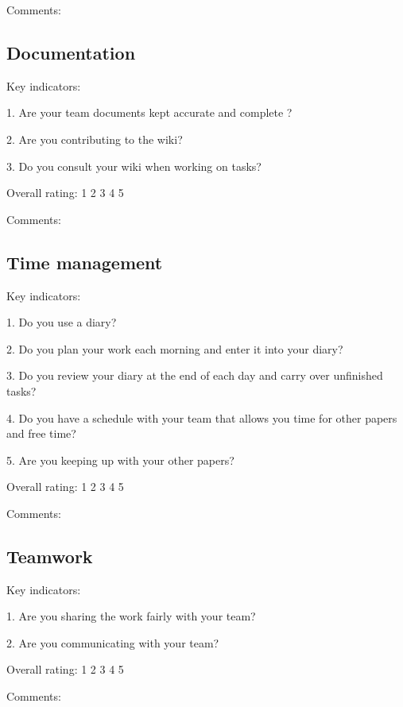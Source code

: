 \documentclass{article}   	%
\begin{document}
Comments:

\vskip 5cm



\subsection*{Documentation}

Key indicators: 

1.  Are your team documents kept accurate and complete ?

2.  Are you contributing to the wiki?

3.  Do you consult your wiki when working on tasks?

Overall rating: \hskip 1cm 1 \hskip 1cm 2 \hskip 1cm 3 \hskip 1cm 4 \hskip 1cm 5 

Comments:

\newpage

\subsection*{Time management}

Key indicators: 

1.  Do you use a diary?

2.  Do you plan your work each morning and enter it into your diary?

3.  Do you review your diary at the end of each day and carry over unfinished tasks?

4.  Do you have a schedule with your team that allows you time for other papers and free time?

5.  Are you keeping up with your other papers?

Overall rating: \hskip 1cm 1 \hskip 1cm 2 \hskip 1cm 3 \hskip 1cm 4 \hskip 1cm 5 

Comments:

\vskip 5cm

\subsection*{Teamwork}

Key indicators: 

1.  Are you sharing the work fairly with your team?

2.  Are you communicating with your team?


Overall rating: \hskip 1cm 1 \hskip 1cm 2 \hskip 1cm 3 \hskip 1cm 4 \hskip 1cm 5 

Comments:

\vskip 4cm
    
\end{document}

